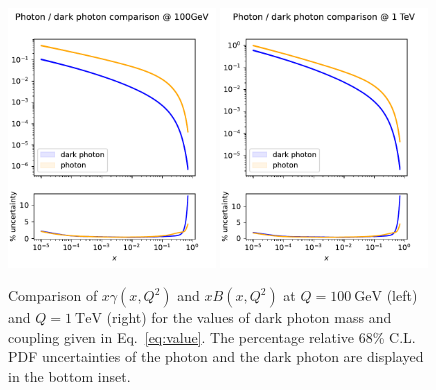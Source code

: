 \documentclass[withindex,glossary]{cam-thesis}
\begin{document}
\begin{figure}[hbt]
\centering
\includegraphics[width=0.49\textwidth]{darkphoton_figures/vhigh_dark_photon_comparison_100GeV.pdf}
\includegraphics[width=0.49\textwidth]{darkphoton_figures/vhigh_dark_photon_comparison_1TeV.pdf}
\caption{Comparison of $x\gamma(x,Q^2)$ and $xB(x,Q^2)$ at $Q=100\ \text{GeV}$ (left) and $Q=1\ \text{TeV}$ (right)
for the values of dark photon mass and coupling given in
Eq.~\eqref{eq:value}. The percentage relative 68\% C.L. PDF
uncertainties of the photon and the dark photon are
  displayed in the bottom inset.}
\label{fig:dark_pdfs}
\end{figure}
\end{document}
